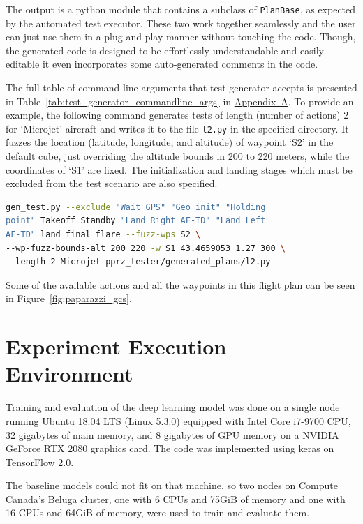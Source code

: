 The output is a python module that contains a subclass of \verb|PlanBase|, as expected by the automated test executor. These two work together seamlessly and the user can just use them in a plug-and-play manner without touching the code. Though, the generated code is designed to be effortlessly understandable and easily editable it even incorporates some auto-generated comments in the code.

The full table of command line arguments that test generator accepts is presented in Table~\ref{tab:test_generator_commandline_args} in \hyperref[appendixa]{Appendix~A}. To provide an example, the following command generates tests of length (number of actions) 2 for `Microjet' aircraft and writes it to the file \verb|l2.py| in the specified directory. It fuzzes the location (latitude, longitude, and altitude) of waypoint `S2' in the default cube, just overriding the altitude bounds in 200 to 220 meters, while the coordinates of `S1' are fixed. The initialization and landing stages which must be excluded from the test scenario are also specified. 
\begin{lstlisting}[language=bash]
gen_test.py --exclude "Wait GPS" "Geo init" "Holding 
point" Takeoff Standby "Land Right AF-TD" "Land Left 
AF-TD" land final flare --fuzz-wps S2 \
--wp-fuzz-bounds-alt 200 220 -w S1 43.4659053 1.27 300 \
--length 2 Microjet pprz_tester/generated_plans/l2.py
\end{lstlisting}
Some of the available actions and all the waypoints in this flight plan can be seen in Figure~\ref{fig:paparazzi_gcs}.













\section{Experiment Execution Environment} \label{sec:machines_config}
Training and evaluation of the deep learning model was done on a single node running Ubuntu 18.04 LTS (Linux 5.3.0) equipped with Intel Core i7-9700 CPU, 32 gigabytes of main memory, and 8 gigabytes of GPU memory on a NVIDIA GeForce RTX 2080 graphics card.
The code was implemented using keras on TensorFlow 2.0.

The baseline models could not fit on that machine, so two nodes on Compute Canada's Beluga cluster, one with 6 CPUs and 75GiB of memory and one with 16 CPUs and 64GiB of memory, were used to train and evaluate them.
